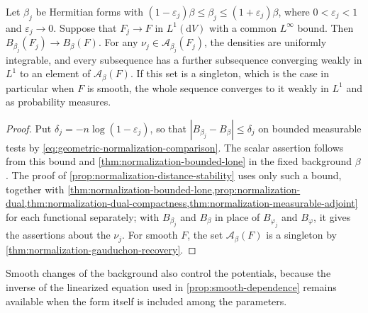 \begin{corollary}\label{cor:geometric-adjoint-stability}
Let $\beta_j$ be Hermitian forms with $(1-\varepsilon_j)\beta\leq\beta_j\leq(1+\varepsilon_j)\beta$, where $0<\varepsilon_j<1$ and $\varepsilon_j\to0$. Suppose that $F_j\to F$ in $L^1(\mathrm{d}V)$ with a common $L^\infty$ bound. Then $B_{\beta_j}(F_j)\to B_\beta(F)$. For any $\nu_j\in\mathcal A_{\beta_j}(F_j)$, the densities are uniformly integrable, and every subsequence has a further subsequence converging weakly in $L^1$ to an element of $\mathcal A_\beta(F)$. If this set is a singleton, which is the case in particular when $F$ is smooth, the whole sequence converges to it weakly in $L^1$ and as probability measures.
\end{corollary}
\begin{proof}
Put $\delta_j=-n\log(1-\varepsilon_j)$, so that $|B_{\beta_j}-B_\beta|\leq\delta_j$ on bounded measurable tests by \eqref{eq:geometric-normalization-comparison}. The scalar assertion follows from this bound and \cref{thm:normalization-bounded-lone} in the fixed background $\beta$. The proof of \cref{prop:normalization-distance-stability} uses only such a bound, together with \cref{thm:normalization-bounded-lone,prop:normalization-dual,thm:normalization-dual-compactness,thm:normalization-measurable-adjoint} for each functional separately; with $B_{\beta_j}$ and $B_\beta$ in place of $B_{\varphi_j}$ and $B_\varphi$, it gives the assertions about the $\nu_j$. For smooth $F$, the set $\mathcal A_\beta(F)$ is a singleton by \cref{thm:normalization-gauduchon-recovery}.
\end{proof}

Smooth changes of the background also control the potentials, because the inverse of the linearized equation used in \cref{prop:smooth-dependence} remains available when the form itself is included among the parameters.

